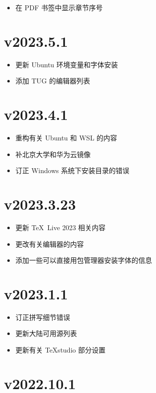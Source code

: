 \begin{itemize}
  \item 在 PDF 书签中显示章节序号
\end{itemize}

\section*{v2023.5.1}

\begin{itemize}
  \item 更新 Ubuntu 环境变量和字体安装
  \item 添加 TUG 的编辑器列表
\end{itemize}

\section*{v2023.4.1}

\begin{itemize}
  \item 重构有关 Ubuntu 和 WSL 的内容
  \item 补北京大学和华为云镜像
  \item 订正 Windows 系统下安装目录的错误
\end{itemize}

\section*{v2023.3.23}

\begin{itemize}
  \item 更新 \TeX\ Live 2023 相关内容
  \item 更改有关编辑器的内容
  \item 添加一些可以直接用包管理器安装字体的信息
\end{itemize}

\section*{v2023.1.1}

\begin{itemize}
  \item 订正拼写细节错误
  \item 更新大陆可用源列表
  \item 更新有关 \TeX studio 部分设置
\end{itemize}

\section*{v2022.10.1}

